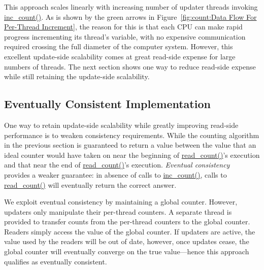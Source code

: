 This approach scales linearly with increasing number of updater threads
invoking \url{inc_count()}.
As is shown by the green arrows in
Figure~\ref{fig:count:Data Flow For Per-Thread Increment},
the reason for this is that each CPU can make rapid progress incrementing
its thread's variable, with no expensive communication required crossing
the full diameter of the computer system.
However, this excellent update-side scalability comes at great read-side
expense for large numbers of threads.
The next section shows one way to reduce read-side expense while
still retaining the update-side scalability.

\subsection{Eventually Consistent Implementation}
\label{sec:count:Eventually Consistent Implementation}

One way to retain update-side scalability while greatly improving
read-side performance is to weaken consistency requirements.
While the counting algorithm in the previous section is guaranteed to
return a value between the value that an ideal counter would have
taken on near the beginning of \url{read_count()}'s execution and
that near the end of \url{read_count()}'s execution.
\emph{Eventual consistency}~\cite{WernerVogels:2009:EventuallyConsistent}
provides a weaker
guarantee: in absence of calls to \url{inc_count()}, calls to
\url{read_count()} will eventually return the correct answer.

We exploit eventual consistency by maintaining a global counter.
However, updaters only manipulate their per-thread counters.
A separate thread is provided to transfer counts from the per-thread
counters to the global counter.
Readers simply access the value of the global counter.
If updaters are active, the value used by the readers will be out of
date, however, once updates cease, the global counter will eventually
converge on the true value---hence this approach qualifies as
eventually consistent.

